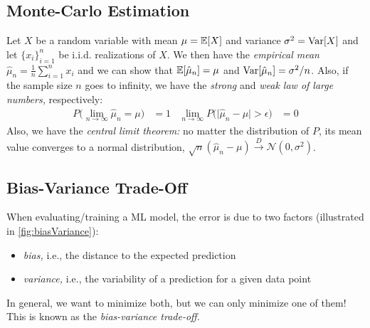 		\subsection{Monte-Carlo Estimation}
			Let \(X\) be a random variable with mean \( \mu = \mathbb{E}[X] \) and variance \( \sigma^2 = \operatorname{Var}[X] \) and let \( \{ x_i \}_{i = 1}^{n} \) be i.i.d. realizations of \(X\). We then have the \emph{empirical mean} \( \hat{\mu}_n = \frac{1}{n} \sum_{i = 1}^{n} x_i \) and we can show that \( \mathbb{E}[\hat{\mu}_n] = \mu \) and \( \operatorname{Var}[\hat{\mu}_n] = \sigma^2/n \). Also, if the sample size \(n\) goes to infinity, we have the \emph{strong} and \emph{weak law of large numbers,} respectively:
			\begin{align}
				P\bigl( \lim\limits_{n \to \infty} \hat{\mu}_n = \mu \bigr) &= 1 &
				\lim\limits_{n \to \infty} P\bigl( \lvert \hat{\mu}_n - \mu \rvert > \epsilon \bigr) &= 0
			\end{align}
			Also, we have the \emph{central limit theorem:} no matter the distribution of \(P\), its mean value converges to a normal distribution, \( \sqrt{n} (\hat{\mu}_n - \mu) \overset{D}{\to} \mathcal{N}(0, \sigma^2) \).

		\subsection{Bias-Variance Trade-Off}
			When evaluating/training a \ac{ML} model, the error is due to two factors (illustrated in \autoref{fig:biasVariance}):
			\begin{itemize}
				\item \emph{bias,} i.e., the distance to the expected prediction
				\item \emph{variance,} i.e., the variability of a prediction for a given data point
			\end{itemize}
			In general, we want to minimize both, but we can only minimize one of them! This is known as the \emph{bias-variance trade-off.}

